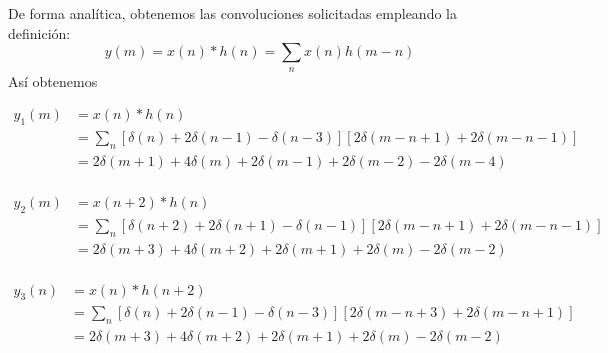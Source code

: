 \documentclass[a4paper,12pt,final]{article}
\begin{document}
      \noindent De forma analítica, obtenemos las convoluciones solicitadas empleando la definición:
      $$y\left(m\right) = x\left(n\right)*h\left(n\right) = \sum_n x\left(n\right)h\left(m-n\right)$$
      \noindent Así obtenemos

      \begin{equation*}
        \begin{split}
          y_1\left(m\right) & = x\left(n\right)*h\left(n\right) \\
                            & = \sum_n \left[\delta\left(n\right) + 2\delta\left(n-1\right) - \delta\left(n-3\right)\right]
                                       \left[2\delta\left(m-n+1\right) + 2\delta\left(m-n-1\right)\right] \\
                            & = 2\delta\left(m+1\right) + 4\delta\left(m\right) + 2\delta\left(m-1\right) + 2\delta\left(m-2\right) - 2\delta\left(m-4\right) \\
        \end{split}
      \end{equation*}

      \begin{equation*}
        \begin{split}
          y_2\left(m\right) & = x\left(n+2\right)*h\left(n\right) \\
                            & = \sum_n \left[\delta\left(n+2\right) + 2\delta\left(n+1\right) - \delta\left(n-1\right)\right]
                                       \left[2\delta\left(m-n+1\right) + 2\delta\left(m-n-1\right)\right] \\
                            & = 2\delta\left(m+3\right) + 4\delta\left(m+2\right) + 2\delta\left(m+1\right) + 2\delta\left(m\right) - 2\delta\left(m-2\right) \\
        \end{split}
      \end{equation*}

      \begin{equation*}
        \begin{split}
          y_3\left(n\right) & = x\left(n\right)*h\left(n+2\right) \\
                            & = \sum_n \left[\delta\left(n\right) + 2\delta\left(n-1\right) - \delta\left(n-3\right)\right]
                                       \left[2\delta\left(m-n+3\right) + 2\delta\left(m-n+1\right)\right] \\
                            & = 2\delta\left(m+3\right) + 4\delta\left(m+2\right) + 2\delta\left(m+1\right) + 2\delta\left(m\right) - 2\delta\left(m-2\right) \\
        \end{split}
      \end{equation*}
\end{document}
